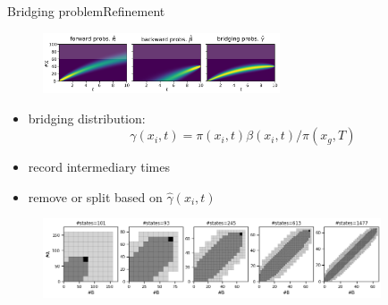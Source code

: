 \documentclass[9pt]{beamer}
\newcommand{\bottomcite}[1]{\vspace*{\fill} {\scriptsize \parencite{#1}}}
\begin{document}
\begin{frame}{Bridging problem}{Refinement}
    \begin{figure}
        \includegraphics[width=7cm]{../gfx/bridging_bd.pdf}
    \end{figure}
    \begin{itemize}
        \item bridging distribution: 
            \[ 
            \gamma(x_i, t) = \pi(x_i, t)\beta(x_i, t)/\pi(x_g, T) \]
        \item record intermediary times
        \item remove or split based on $\hat{\gamma}(x_i, t)$
    \end{itemize}
    \begin{figure}
        \includegraphics[width=10cm]{../gfx/refinement.png}
    \end{figure}

    \bottomcite{backenkohler2020analysis}
\end{frame}
\end{document}
